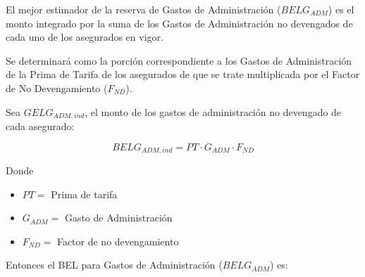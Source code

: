 \documentclass[11pt,twoside,openright,spanish]{report}
\numberwithin{equation}{chapter}
\numberwithin{figure}{chapter}
\numberwithin{table}{chapter}
\begin{document}
	El mejor estimador de la reserva de Gastos de Administración ($BELG_{ADM}$) es el monto integrado por la suma de los Gastos de Administración no devengados de cada uno de los asegurados en vigor.
	
	 
	
	Se determinará como la porción correspondiente a los Gastos de Administración de la Prima de Tarifa de los asegurados de que se trate multiplicada por el Factor de No Devengamiento ($F_{ND}$). 
\begin{comment}
Para Salud Individual Dental, se tomara el porcentaje de gasto de administración del mercado proporcionado por la Comisión Nacional de Seguros y Fianzas.
\end{comment}	
	 
	
	Sea $GELG_{ADM,ind}$, el monto de los gastos de administración no devengado de cada asegurado:
	
	 

\begin{comment}	
$
BELG_{ADM,ind}=\begin{cases}
PT \cdot G_{ADM} \cdot F_{ND}, & \text{$g \neq Salud  Dental  Individual$}.\\
PT \cdot \alpha_{i} \cdot F_{ND}, & \text{$g = Salud  Dental  Individual$}.
\end{cases}
$
\end{comment}

\begin{equation}
BELG_{ADM,ind}=	PT \cdot G_{ADM} \cdot F_{ND}
\label{eq10}
\end{equation}



	Donde
	 
		\begin{itemize}
		\setlength\itemsep{-0.5em}
    \item $PT=$ Prima de tarifa
    
    \item $G_{ADM}^{}=$ Gasto de Administración
	
	\item $F_{ND}^{}=$ Factor de no devengamiento
	\end{itemize}
	
\begin{comment}	
	$\alpha_{i}^{}=$ Porcentaje de gasto de administración con información de Mercado
\end{comment}	
	 


	Entonces el BEL para Gastos de Administración ($BELG_{ADM}$) es:
	
\end{document}
